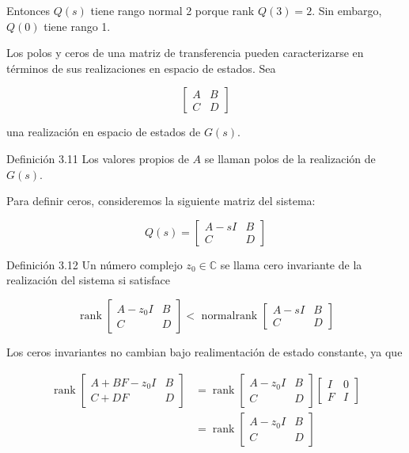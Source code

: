 \documentclass[11pt]{article}
\begin{document}
Entonces $Q(s)$ tiene rango normal 2 porque rank $Q(3)=2$. Sin embargo, $Q(0)$ tiene rango 1.

Los polos y ceros de una matriz de transferencia pueden caracterizarse en términos de sus realizaciones en espacio de estados. Sea

$$
\left[\begin{array}{c|c}
A & B \\
\hline C & D
\end{array}\right]
$$

una realización en espacio de estados de $G(s)$.

Definición 3.11 Los valores propios de $A$ se llaman polos de la realización de $G(s)$.

Para definir ceros, consideremos la siguiente matriz del sistema:

$$
Q(s)=\left[\begin{array}{cc}
A-s I & B \\
C & D
\end{array}\right]
$$

Definición 3.12 Un número complejo $z_{0} \in \mathbb{C}$ se llama cero invariante de la realización del sistema si satisface

$$
\operatorname{rank}\left[\begin{array}{cc}
A-z_{0} I & B \\
C & D
\end{array}\right]<\text { normalrank }\left[\begin{array}{cc}
A-s I & B \\
C & D
\end{array}\right]
$$

Los ceros invariantes no cambian bajo realimentación de estado constante, ya que

$$
\begin{aligned}
\operatorname{rank}\left[\begin{array}{cc}
A+B F-z_{0} I & B \\
C+D F & D
\end{array}\right] & =\operatorname{rank}\left[\begin{array}{cc}
A-z_{0} I & B \\
C & D
\end{array}\right]\left[\begin{array}{cc}
I & 0 \\
F & I
\end{array}\right] \\
& =\operatorname{rank}\left[\begin{array}{cc}
A-z_{0} I & B \\
C & D
\end{array}\right]
\end{aligned}
$$
\end{document}
